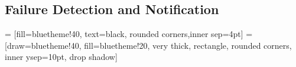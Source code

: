 \subsection{Failure Detection and Notification}

\newcommand{\processes}{\ensuremath{{\mathcal P}}}
\newcommand{\status}[2]{\ensuremath{S_{#1}^{#2}}}
\newcommand{\emitter}{\ensuremath{\texttt{emitter}}\xspace}
\newcommand{\observer}{\ensuremath{\texttt{observer}}\xspace}
\newcommand{\alive}{\ensuremath{\texttt{alive}}\xspace}
\newcommand{\dead}{\ensuremath{\texttt{dead}}}
\newcommand{\heartbeat}{\ensuremath{\textsc{heartbeat}}\xspace}
\newcommand{\timeoutping}{\ensuremath{\textsc{HB-Timeout}}\xspace}
\newcommand{\timeoutsuspect}{\ensuremath{\textsc{Susp-Timeout}}\xspace}
\newcommand{\timeout}[1]{\ensuremath{\textsc{Timeout}_{#1}}\xspace}
\newcommand{\newobserver}{\ensuremath{\textsc{NewObserver}}\xspace}
\newcommand{\findpred}{\ensuremath{\textit{FindEmitter}}\xspace}
\newcommand{\neighbors}{\ensuremath{\textit{Neighbors}}\xspace}
\newcommand{\broadcastmsg}{\ensuremath{\textsc{BcastMsg}}\xspace}
\newcommand{\pinginterval}{\ensuremath{\eta}\xspace}
\newcommand{\msgtime}{\ensuremath{\tau}\xspace}
\newcommand{\suspectinterval}{\ensuremath{\delta}\xspace}
\newcommand{\emittors}[1]{\ensuremath{M(#1)}}
\newcommand{\ringemittor}[1]{\ensuremath{M_R(#1)}}
\newcommand{\additionalemittors}[1]{\ensuremath{M_A(#1)}}
\newcommand{\receivers}[1]{\ensuremath{O(#1)}}
\newcommand{\ringreceiver}[1]{\ensuremath{O_R(#1)}}
\newcommand{\additionalreceivers}[1]{\ensuremath{O_A(#1)}}
\newcommand{\transfer}[2]{\ensuremath{T_{#1,#2}}}
\newcommand{\deadmsg}[1]{\ensuremath{\texttt{DeadMsg(\ensuremath{#1})}}}
\newcommand{\broadcastneighbors}[1]{\ensuremath{\mathcal B}_{#1}}
\newcommand{\deads}[1]{\ensuremath{{\mathcal D}_{#1}}}
\newcommand{\muind}{\ensuremath{\mu_{\text{ind}}}}
\newcommand{\ringalgorithm}{\textsc{RingAlgorithm}}

\newcommand{\probaSymbol}{\mathbb P}
\newcommand{\proba}[1]{\probaSymbol\left(#1\right)}


\usetikzlibrary{shadows,patterns,shapes}

 = [fill=bluetheme!40, text=black, rounded corners,inner sep=4pt] 
 = [draw=bluetheme!40, fill=bluetheme!20, very thick, rectangle, rounded corners, inner ysep=10pt, drop shadow]

